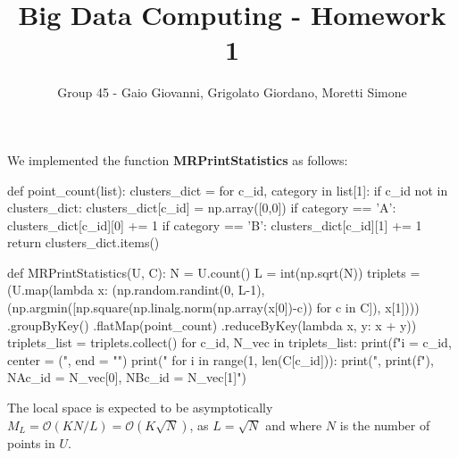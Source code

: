 \documentclass[12pt,a4paper]{article}
\title{Big Data Computing - Homework 1}
\author{Group 45 - Gaio Giovanni, Grigolato Giordano, Moretti Simone}
\date{}
\begin{document}
\maketitle    
We implemented the function \textbf{MRPrintStatistics} as follows:
\begin{python}
def point_count(list):
    clusters_dict = {}
    for c_id, category in list[1]:
        if c_id not in clusters_dict: clusters_dict[c_id] = np.array([0,0])
        if category == 'A':
          clusters_dict[c_id][0] += 1
        if category == 'B':
          clusters_dict[c_id][1] += 1
    return clusters_dict.items()

def MRPrintStatistics(U, C):
    N = U.count()
    L = int(np.sqrt(N))
    triplets = (U.map(lambda x: (np.random.randint(0, L-1), (np.argmin([np.square(np.linalg.norm(np.array(x[0])-c)) for c in C]), x[1])))
                 .groupByKey()
                 .flatMap(point_count)
                 .reduceByKey(lambda x, y: x + y))
    triplets_list = triplets.collect()
    for c_id, N_vec in triplets_list:
        print(f"i = {c_id}, center = (", end = "")
        print("%
        for i in range(1, len(C[c_id])):
            print(",%
        print(f"), NA{c_id} = {N_vec[0]}, NB{c_id} = {N_vec[1]}")
\end{python}
The local space is expected to be asymptotically $M_L = \mathcal{O}(KN/L) = \mathcal{O}(K\sqrt{N})$, as $L = \sqrt{N}$ and where $N$ is the number of points in $U$.
\end{document}

